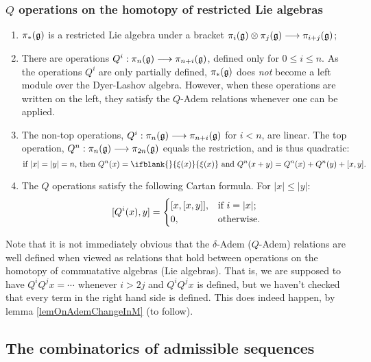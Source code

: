 \documentclass[10pt]{article}
\newcommand{\restn}[2][]{\ifblank{#1}{\xi{#2}}{\xi_{#1}{#2}}}%
\renewcommand{\Q}{Q}
\begin{document}
\begin{SteenrodAlgebrasAndTheirKoszulDuals}
\subsubsection{$\Q$ operations on the homotopy of restricted Lie algebras}
\begin{enumerate}\squishlist
\setlength{\parindent}{.25in}
\item $\pi_*(\mathfrak{g})$ is a restricted Lie algebra under a bracket $\pi_i(\mathfrak{g})\otimes \pi_j(\mathfrak{g})\longrightarrow \pi_{i+j}(\mathfrak{g})$;
\item There are operations $\Q^i:\pi_n(\frakg)\to \pi_{n+i}(\frakg)$, defined only for $0\leq i\leq n$. As the operations $\Q^i$ are only partially defined, $\pi_*(\mathfrak{g})$ does \emph{not} become a left module over the Dyer-Lashov algebra. However, when these operations are written on the left, they satisfy the $\Q$-Adem relations whenever one can be applied.
\item The non-top operations, $\Q^i:\pi_n(\frakg)\to \pi_{n+i}(\frakg)$ for $i<n$, are linear. The top operation, $\Q^n:\pi_n(\frakg)\to \pi_{2n}(\frakg)$ equals the restriction, and is thus quadratic:
\[\textup{if $|x|=|y|=n$, then }\Q^n(x)=\restn{(x)}\textup{ and }\Q^n(x+y)=\Q^n(x)+\Q^n(y)+[x,y].\]
\item The $\Q$ operations satisfy the following Cartan formula. For $|x|\leq |y|$:
\[[\Q^i(x),y]=\begin{cases}
[x,[x,y]],&\textup{if }i=|x|;\\
0,&\textup{otherwise}.
\end{cases}
\]
\end{enumerate}

Note that it is not immediately obvious that the $\delta$-Adem ($\Q$-Adem) relations are well defined when viewed as relations that hold between operations on the homotopy of commuatative algebras (Lie algebras). That is, we are supposed to have $\Q^i\Q^jx=\cdots $ whenever $i>2j$ and $\Q^i\Q^jx$ is defined, but we haven't checked that every term in the right hand side is defined. This does indeed happen, by lemma \ref{lemOnAdemChangeInM} (to follow). 

\subsection{The combinatorics of admissible sequences}


\end{SteenrodAlgebrasAndTheirKoszulDuals}
\end{document}
